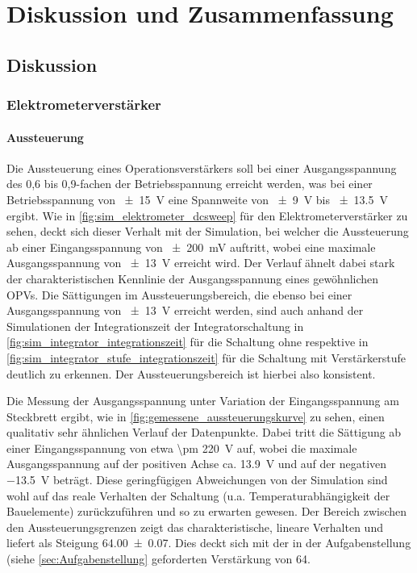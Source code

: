 \documentclass[12pt,english,ngerman]{scrartcl}
\begin{document}
\section{Diskussion und Zusammenfassung}\label{sec:Diskussion} 
\subsection{Diskussion}

\subsubsection{Elektrometerverstärker}
\paragraph{Aussteuerung}
Die Aussteuerung eines Operationsverstärkers soll bei einer Ausgangsspannung
des 0,6 bis 0,9-fachen der Betriebsspannung erreicht werden, was bei einer
Betriebsspannung von \SI{\pm 15}{\volt} eine Spannweite von \SI{\pm 9}{\volt}
bis \SI{\pm 13,5}{\volt} ergibt. Wie in \autoref{fig:sim_elektrometer_dcsweep}
für den Elektrometerverstärker zu sehen, deckt sich dieser Verhalt mit der
Simulation, bei welcher die Aussteuerung ab einer Eingangsspannung von 
\SI{\pm 200}{\milli\volt} auftritt, wobei eine maximale Ausgangsspannung von
\SI{\pm 13}{\volt} erreicht wird. Der Verlauf ähnelt dabei stark der
charakteristischen Kennlinie der Ausgangsspannung eines gewöhnlichen OPVs. Die
Sättigungen im Aussteuerungsbereich, die ebenso bei einer Ausgangsspannung von
\SI{\pm 13}{\volt} erreicht werden, sind auch anhand der Simulationen der
Integrationszeit der Integratorschaltung in
\autoref{fig:sim_integrator_integrationszeit} für die Schaltung ohne respektive
in \autoref{fig:sim_integrator_stufe_integrationszeit} für die Schaltung mit
Verstärkerstufe deutlich zu erkennen. Der Aussteuerungsbereich ist
hierbei also konsistent.

Die Messung der Ausgangsspannung unter Variation der Eingangsspannung am
Steckbrett ergibt, wie in \autoref{fig:gemessene_aussteuerungskurve} zu sehen,
einen qualitativ sehr ähnlichen Verlauf der Datenpunkte. 
Dabei tritt die Sättigung ab einer Eingangsspannung von etwa \SI{\pm
220}{\volt} auf, wobei die maximale Ausgangsspannung auf der positiven Achse
ca. \SI{13,9}{\volt} und auf der negativen \SI{-13,5}{\volt} beträgt. Diese
geringfügigen Abweichungen von der Simulation sind wohl auf das reale Verhalten
der Schaltung (u.a. Temperaturabhängigkeit der Bauelemente) zurückzuführen und
so zu erwarten gewesen. Der Bereich zwischen den Aussteuerungsgrenzen
zeigt das charakteristische, lineare Verhalten und liefert als
Steigung \num{64.00(7)}. Dies deckt sich mit der in der Aufgabenstellung
(siehe \autoref{sec:Aufgabenstellung} geforderten Verstärkung von \num{64}.
\end{document}
